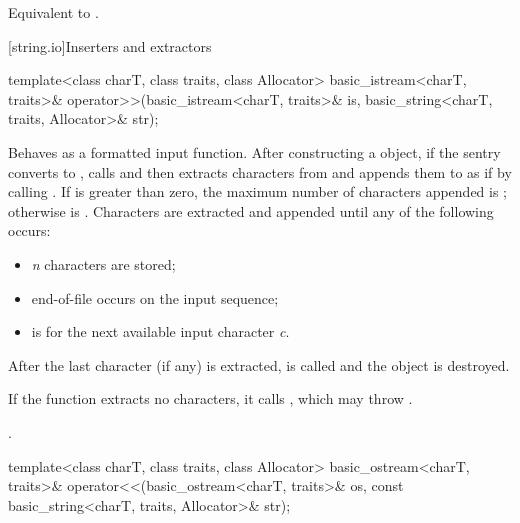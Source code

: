 \begin{itemdescr}
\pnum
\effects
Equivalent to .
\end{itemdescr}

[string.io]{Inserters and extractors}

%
\begin{itemdecl}
template<class charT, class traits, class Allocator>
  basic_istream<charT, traits>&
    operator>>(basic_istream<charT, traits>& is, basic_string<charT, traits, Allocator>& str);
\end{itemdecl}

\begin{itemdescr}
\pnum
\effects
Behaves as a formatted input function.
After constructing a
object, if the sentry converts to , calls
and then extracts characters from  and appends them
to  as if by calling
.
If
is greater than zero, the maximum
number  of characters appended is
;
otherwise  is
.
Characters are extracted and appended until any of the following
occurs:
\begin{itemize}
\item
\textit{n}
characters are stored;
\item
end-of-file occurs on the input sequence;
\item
{}
is  for the next available input character
\textit{c}.
\end{itemize}

\pnum
After the last character (if any) is extracted,
is called and the
object is destroyed.

\pnum
If the function extracts no characters, it calls
,
which may throw
.

\pnum
\returns
{}.
\end{itemdescr}

%
\begin{itemdecl}
template<class charT, class traits, class Allocator>
  basic_ostream<charT, traits>&
    operator<<(basic_ostream<charT, traits>& os,
               const basic_string<charT, traits, Allocator>& str);
\end{itemdecl}

